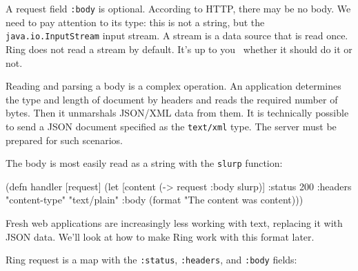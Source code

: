 
A request field \verb|:body| is optional. According to HTTP, there may be no body. We need to pay attention to its type: this is not a string, but the \verb|java.io.InputStream| input stream. A stream is a data source that is read once. Ring does not read a stream by default. It's up to you  whether it should do it or not.


Reading and parsing a body is a complex operation. An application determines the type and length of document by headers and reads the required number of bytes. Then it unmarshals JSON/XML data from them. It is technically possible to send a JSON document specified as the \verb|text/xml| type. The server must be prepared for such scenarios.

The body is most easily read as a string with the \verb|slurp| function:

\ifx\devicetype\mobile

\begin{english}
\begin{clojure}
(defn handler [request]
(let [content (-> request :body slurp)]
{:status 200
:headers {"content-type" "text/plain"}
:body (format "The content was %
content)}))
\end{clojure}
\end{english}

\else

\begin{english}
\end{english}

\fi

Fresh web applications are increasingly less working with text, replacing it with JSON data. We'll look at how to make Ring work with this format later.


Ring request is a map with the \verb|:status|, \verb|:headers|, and \verb|:body| fields:


